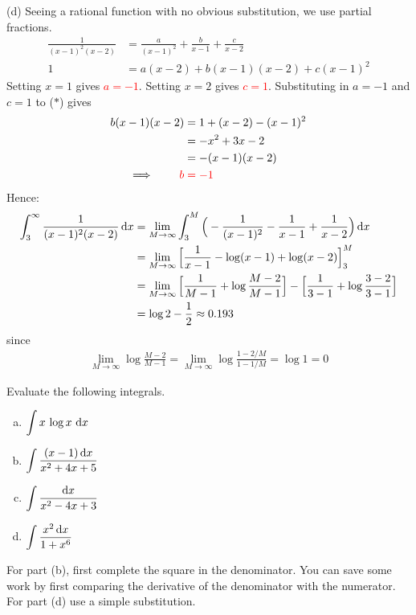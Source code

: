 \begin{solution}
\noindent (d)
Seeing a rational function with no obvious substitution, we use partial fractions.
\begin{align*}
\frac{1}{(x-1)^2(x-2)}
&=\frac{a}{(x-1)^2}+\frac{b}{x-1}+\frac{c}{x-2}\\
1&=a(x-2)+b(x-1)(x-2)+c(x-1)^2\tag{$*$}
\end{align*}
Setting $x=1$ gives \textcolor{red}{$a=-1$}. Setting $x=2$ gives \textcolor{red}{$c=1$}. Substituting in $a=-1$
and $c=1$ to ($*$) gives
\begin{align*}
b(x-1)(x-2)&=1+(x-2)-(x-1)^2\\
&=-x^2+3x-2\\
&=-(x-1)(x-2)\\
\implies\qquad \color{red}b&\color{red}=-1
\end{align*}
Hence:
\begin{align*}
\int_3^\infty\frac{1}{(x-1)^2(x-2)}\,\mathrm{d}x
&=\lim_{M\rightarrow\infty}
\int_3^M\Big(-\frac{1}{(x-1)^2}-\frac{1}{x-1}+\frac{1}{x-2}\Big)\,\mathrm{d}x \\
&=\lim_{M\rightarrow\infty}
\Big[\frac{1}{x-1}-\log(x-1)+\log(x-2)\Big]_3^M\\
&=\lim_{M\rightarrow\infty}
\Big[\frac{1}{M-1}+\log\frac{M-2}{M-1}\Big]
-\Big[\frac{1}{3-1}+\log\frac{3-2}{3-1}\Big] \\
&=\log 2-\frac{1}{2}\approx0.193
\end{align*}
since
\begin{align*}
\lim_{M\rightarrow\infty}\log\frac{M-2}{M-1}
=\lim_{M\rightarrow\infty}\log\frac{1-2/M}{1-1/M}
=\log 1=0
\end{align*}

\end{solution}

\begin{question}[2002A]
Evaluate the following integrals.
\begin{enumerate}[(a)]
\item
$\displaystyle\int x\,\log x\ \dee{x}$
\item
 $\displaystyle\int\frac{(x-1)\,\mathrm{d}x}{x^2+4x+5}$
\item
$\displaystyle\int\frac{\mathrm{d}x}{x^2-4x+3}$
\item
$\displaystyle\int\frac{x^2\,\mathrm{d}x}{1+x^6}$
\end{enumerate}
\end{question}

\begin{hint}
For part (b), first complete the square in the denominator.
You can save some work by first comparing the derivative of the denominator
            with the numerator.
For part (d) use a simple substitution.
\end{hint}

